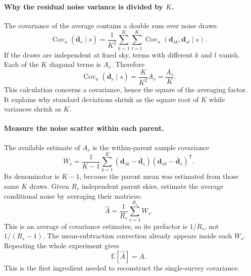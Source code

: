 \documentclass[11pt]{article}
\newcommand{\T}{^{\mathsf{T}}}
\newcommand{\E}{\mathbb{E}}
\newcommand{\cov}{\operatorname{Cov}}
\begin{document}
\paragraph{Why the residual noise variance is divided by $K$.}
The covariance of the average contains a double sum over noise draws:
\begin{equation}
 \cov_n(\bar{\boldsymbol d}_s\mid s)
 =\frac1{K^2}\sum_{k=1}^{K}\sum_{l=1}^{K}
       \cov_n(\boldsymbol d_{sk},\boldsymbol d_{sl}\mid s).
\end{equation}
If the draws are independent at fixed sky, terms with different $k$ and
$l$ vanish. Each of the $K$ diagonal terms is $A_s$. Therefore
\begin{equation}
 \cov_n(\bar{\boldsymbol d}_s\mid s)
     =\frac{K}{K^2}A_s=\frac{A_s}{K}.
\end{equation}
This calculation concerns a covariance, hence the square of the
averaging factor. It explains why standard deviations shrink as the
square root of $K$ while variances shrink as $K$.

\paragraph{Measure the noise scatter within each parent.}
The available estimate of $A_s$ is the within-parent sample covariance
\begin{equation}
 W_s=\frac1{K-1}\sum_{k=1}^{K}
       (\boldsymbol d_{sk}-\bar{\boldsymbol d}_s)
       (\boldsymbol d_{sk}-\bar{\boldsymbol d}_s)\T.
\end{equation}
Its denominator is $K-1$, because the parent mean was estimated from
those same $K$ draws. Given $R_s$ independent parent skies, estimate the
average conditional noise by averaging their matrices:
\begin{equation}
 \widehat A=\frac1{R_s}\sum_{s=1}^{R_s}W_s.
\end{equation}
This is an average of covariance estimates, so its prefactor is
$1/R_s$, not $1/(R_s-1)$. The mean-subtraction correction already appears
inside each $W_s$. Repeating the whole experiment gives
\begin{equation}
 \E[\widehat A]=A.
 \label{eq:mean-Ahat}
\end{equation}
This is the first ingredient needed to reconstruct the single-survey
covariance.
\end{document}
